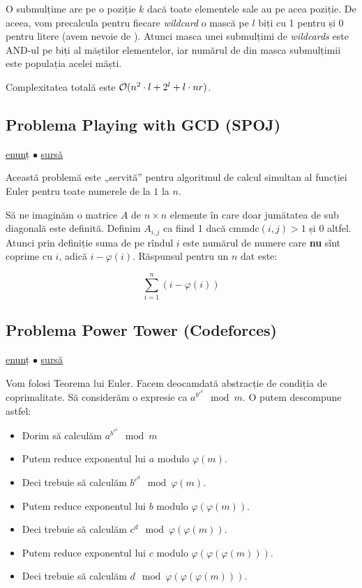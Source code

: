 \documentclass[../main.tex]{subfiles}
\begin{document}
O submulțime are  pe o poziție $k$ dacă toate elementele sale au  pe acea poziție. De aceea, vom precalcula pentru fiecare \textit{wildcard} o mască pe $l$ biți cu 1 pentru  și 0 pentru litere (avem nevoie de ). Atunci masca unei submulțimi de \textit{wildcards} este AND-ul pe biți al măștilor elementelor, iar numărul de  din masca submulțimii este populația acelei măști.

Complexitatea totală este $\mathcal{O}(n^2 \cdot l + 2^l + l \cdot nr)$.


\subsection{Problema Playing with GCD (SPOJ)}
\label{problem:playing-with-gcd}

\href{https://www.spoj.com/problems/NAJPWG/}{enunț}
$\bullet$
\hyperref[code:playing-with-gcd]{sursă}

Această problemă este „servită” pentru algoritmul de calcul simultan al funcției Euler pentru toate numerele de la $1$ la $n$.

Să ne imaginăm o matrice $A$ de $n \times n$ elemente în care doar jumătatea de sub diagonală este definită. Definim $A_{i,j}$ ca fiind 1 dacă $\text{cmmdc}(i, j) > 1$ și 0 altfel. Atunci prin definiție suma de pe rîndul $i$ este numărul de numere care \textbf{nu} sînt coprime cu $i$, adică $i - \varphi(i)$. Răspunsul pentru un $n$ dat este:

$$\sum_{i=1}^n (i - \varphi(i))$$


\subsection{Problema Power Tower (Codeforces)}
\label{problem:power-tower}

\href{https://codeforces.com/contest/906/problem/D}{enunț}
$\bullet$
\hyperref[code:power-tower]{sursă}

Vom folosi Teorema lui Euler. Facem deocamdată abstracție de condiția de coprimalitate. Să considerăm o expresie ca $a^{b^{c^d}} \mod m$. O putem descompune astfel:

\begin{itemize}
  \item Dorim să calculăm $a^{b^{c^d}} \mod m$
  \item Putem reduce exponentul lui $a$ modulo $\varphi(m)$.
  \item Deci trebuie să calculăm $b^{c^d} \mod \varphi(m)$.
  \item Putem reduce exponentul lui $b$ modulo $\varphi(\varphi(m))$.
  \item Deci trebuie să calculăm $c^d \mod \varphi(\varphi(m))$.
  \item Putem reduce exponentul lui $c$ modulo $\varphi(\varphi(\varphi(m)))$.
  \item Deci trebuie să calculăm $d \mod \varphi(\varphi(\varphi(m)))$.
\end{itemize}
\end{document}

